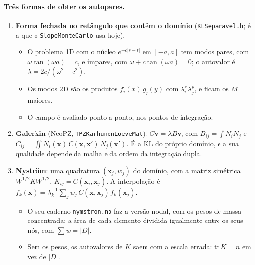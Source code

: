 \paragraph{Três formas de obter os autopares.}
\begin{enumerate}
  \item \textbf{Forma fechada no retângulo que contém o domínio} (\texttt{KLSeparavel.h}; é a que o \texttt{SlopeMonteCarlo}
    usa hoje).
    \begin{itemize}
      \item O problema 1D com o núcleo $e^{-c|s - t|}$ em $[-a, a]$ tem modos pares, com $\omega \tan(\omega a) = c$, e
        ímpares, com $\omega + c\tan(\omega a) = 0$; o autovalor é $\lambda = 2c/(\omega^2 + c^2)$.
      \item Os modos 2D são os produtos $f_i(x)\,g_j(y)$ com $\lambda_i^x \lambda_j^y$, e ficam os $M$ maiores.
      \item O campo é avaliado ponto a ponto, nos pontos de integração.
    \end{itemize}
  \item \textbf{Galerkin} (NeoPZ, \texttt{TPZKarhunenLoeveMat}): $C\bm v = \lambda B \bm v$, com
    $B_{ij} = \int N_i N_j$ e $C_{ij} = \iint N_i(\bm x)\, C(\bm x, \bm x')\, N_j(\bm x')$. É a KL do próprio domínio, e a
    sua qualidade depende da malha e da ordem da integração dupla.
  \item \textbf{Nyström}: uma quadratura $(\bm x_j, w_j)$ do domínio, com a matriz simétrica $W^{1/2} K W^{1/2}$,
    $K_{ij} = C(\bm x_i, \bm x_j)$. A interpolação é
    $f_k(\bm x) = \lambda_k^{-1} \sum_j w_j\, C(\bm x, \bm x_j)\, f_k(\bm x_j)$.
    \begin{itemize}
      \item O seu caderno \texttt{nymstron.nb} faz a versão nodal, com os pesos de massa concentrada: a área de cada
        elemento dividida igualmente entre os seus nós, com $\sum w = |D|$.
      \item Sem os pesos, os autovalores de $K$ saem com a escala errada: $\mathrm{tr}\,K = n$ em vez de $|D|$.
    \end{itemize}
\end{enumerate}

